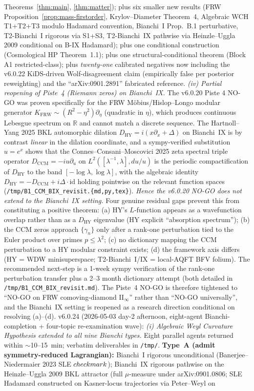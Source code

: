 \documentclass[reprint,amsmath,amssymb,aps,prd,superscriptaddress]{revtex4-2}
\providecommand{\FRW}{\mathrm{FRW}}
\providecommand{\R}{\mathbb{R}}
\providecommand{\1}{\mathbf{1}}
\begin{document}
Theorems~\ref{thm:main}, \ref{thm:matter}); plus six smaller new results (FRW Proposition~\ref{prop:mass-firstorder}, Krylov--Diameter Theorem~4, Algebraic WCH T1+T2+T3 modulo Hadamard convention, Bianchi~I Prop.~B.1 perturbative, T2-Bianchi~I rigorous via S1+S3, T2-Bianchi~IX pathwise via Heinzle--Uggla 2009 conditional on B-IX Hadamard); plus one conditional construction (Cosmological HP Theorem~1.1); plus one structural-conditional theorem (Block A1 restricted-class); plus \emph{twenty-one} calibrated negatives now including the v6.0.22 KiDS-driven Wolf-disagreement claim (empirically false per posterior reweighting) and the ``arXiv:0901.2891'' fabricated reference. \emph{(iv) Partial reopening of Piste~4 (Riemann zeros) on Bianchi~IX.} The v6.0.20 Piste 4 NO-GO was proven specifically for the FRW M\"obius/Hislop--Longo modular generator $K_\FRW \sim (R^2-\eta^2)\partial_\eta$ (quadratic in $\eta$), which produces continuous Lebesgue spectrum on $\R$ and cannot match a discrete sequence. The Hartnoll--Yang 2025 BKL automorphic dilation $D_\mathrm{HY}=i(x\partial_x+\Delta)$ on Bianchi~IX is by contrast \emph{linear} in the dilation coordinate, and a sympy-verified substitution $u=e^x$ shows that the Connes--Consani--Moscovici 2025 zeta spectral triple operator $D_\mathrm{CCM}=-iu\partial_u$ on $L^2([\lambda^{-1},\lambda],du/u)$ is the periodic compactification of $D_\mathrm{HY}$ to the band $[-\log\lambda,\log\lambda]$, with the algebraic identity $D_\mathrm{HY} = -D_\mathrm{CCM}+i\Delta\cdot\mathrm{id}$ holding pointwise on the relevant function spaces (\texttt{/tmp/B1\_CCM\_BIX\_revisit.\{md,py,tex\}}). \emph{Hence the v6.0.20 NO-GO does not extend to the Bianchi~IX setting.} Four genuine residual gaps prevent this from constituting a positive theorem: (a) HY's $L$-function appears as a wavefunction overlap rather than as a $D_\mathrm{HY}$ eigenvalue (HY explicit ``absorption spectrum''); (b) the CCM zeros approach $\{\gamma_n\}$ only after a rank-one perturbation tied to the Euler product over primes $p\le\lambda^2$; (c) no dictionary mapping the CCM perturbation to a HY modular constraint exists; (d) the framework axis differs (HY = WDW minisuperspace; T2-Bianchi~I/IX = local-AQFT BFV folium). The recommended next-step is a 1-week sympy verification of the rank-one perturbation transfer plus a 2--3 month dictionary attempt (both detailed in \texttt{/tmp/B1\_CCM\_BIX\_revisit.md}). The Piste~4 NO-GO is therefore tightened to ``NO-GO on FRW comoving-diamond II$_\infty$'' rather than ``NO-GO universally'', and the Bianchi~IX setting is reopened as a research direction conditional on resolving (a)--(d). v6.0.24 (2026-05-03 day-2 afternoon, eight-agent Bianchi-completion + four-topic re-examination wave): \emph{(i) Algebraic Weyl Curvature Hypothesis extended to all nine Bianchi types.} Eight parallel agents returned within $\sim$10--15~min; verbatim deliverables in \texttt{/tmp/}. \textbf{Type~A (admit symmetry-reduced Lagrangian):} Bianchi~I rigorous unconditional (Banerjee--Niedermaier 2023 SLE $\\checkmark$); Bianchi~IX rigorous pathwise on the Heinzle--Uggla 2009 BKL attractor (full $\mu$-measure under arXiv:0901.0806; SLE Hadamard constructed on Kasner-locus trajectories via Peter--Weyl on 
\end{document}
